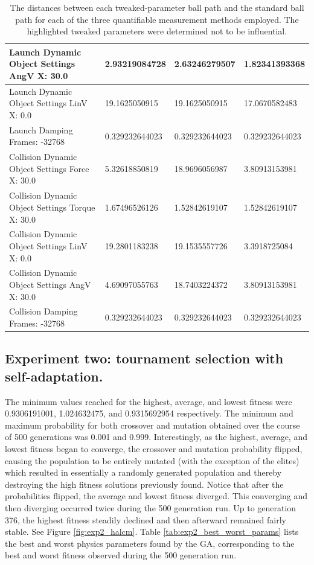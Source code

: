 \begin{table}[htbp]
\begin{tabular}{ | l || l | l | l | }
Launch Dynamic Object Settings AngV X: 30.0 & 2.93219084728  & 2.63246279507  & 1.82341393368 \\ \hline
Launch Dynamic Object Settings LinV X: 0.0 & 19.1625050915  & 19.1625050915  & 17.0670582483 \\ \hline
\rowcolor{cyan}
Launch Damping Frames: -32768 & 0.329232644023 & 0.329232644023  & 0.329232644023 \\ \hline
Collision Dynamic Object Settings Force X: 30.0 & 5.32618850819  & 18.9696056987  & 3.80913153981 \\ \hline
Collision Dynamic Object Settings Torque X: 30.0 & 1.67496526126  & 1.52842619107  & 1.52842619107 \\ \hline
Collision Dynamic Object Settings LinV X: 0.0 & 19.2801183238  & 19.1535557726  & 3.3918725084 \\ \hline
Collision Dynamic Object Settings AngV X: 30.0 & 4.69097055763 & 18.7403224372 & 3.80913153981 \\ \hline
\rowcolor{cyan}
Collision Damping Frames: -32768 & 0.329232644023 & 0.329232644023 & 0.329232644023 \\ \hline
\end{tabular}
\caption[Physics Engine Parameter Influences]{The distances between each tweaked-parameter ball path and the standard ball path for each of the three quantifiable measurement methods employed. The highlighted tweaked parameters were determined not to be influential.}
\label{tab:distances}
\end{table}

\newpage

\subsection[Experiment Two]{Experiment two: tournament selection with self-adaptation.}
\label{subsec:bbautotune_exp_two}

The minimum values reached for the highest, average, and lowest fitness were 0.9306191001, 1.024632475, and 0.9315692954 respectively. The minimum and maximum probability for both crossover and mutation obtained over the course of 500 generations was 0.001 and 0.999. Interestingly, as the highest, average, and lowest fitness began to converge, the crossover and mutation probability flipped, causing the population to be entirely mutated (with the exception of the elites) which resulted in essentially a randomly generated population and thereby destroying the high fitness solutions previously found. Notice that after the probabilities flipped, the average and lowest fitness diverged. This converging and then diverging occurred twice during the 500 generation run. Up to generation 376, the highest fitness steadily declined and then afterward remained fairly stable. See Figure \ref{fig:exp2_halcm}. Table \ref{tab:exp2_best_worst_params} lists the best and worst physics parameters found by the GA, corresponding to the best and worst fitness observed during the 500 generation run.

